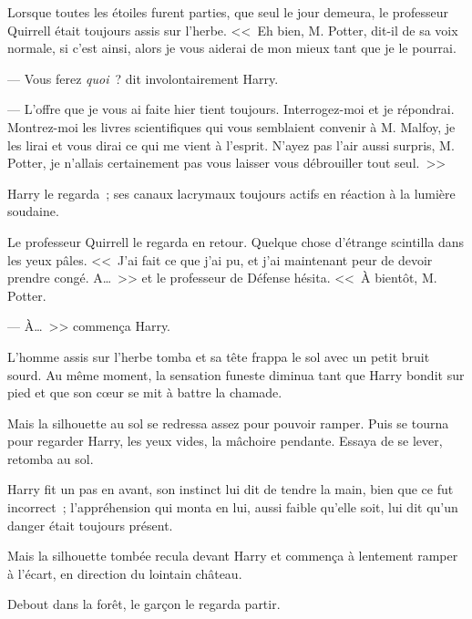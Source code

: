 Lorsque toutes les étoiles furent parties, que seul le jour demeura, le professeur Quirrell était toujours assis sur l'herbe. <<~Eh bien, M. Potter, dit-il de sa voix normale, si c'est ainsi, alors je vous aiderai de mon mieux tant que je le pourrai.

--- Vous ferez \emph{quoi}~? dit involontairement Harry.

--- L'offre que je vous ai faite hier tient toujours. Interrogez-moi et je répondrai. Montrez-moi les livres scientifiques qui vous semblaient convenir à M. Malfoy, je les lirai et vous dirai ce qui me vient à l'esprit. N'ayez pas l'air aussi surpris, M. Potter, je n'allais certainement pas vous laisser vous débrouiller tout seul.~>>

Harry le regarda~; ses canaux lacrymaux toujours actifs en réaction à la lumière soudaine.

Le professeur Quirrell le regarda en retour. Quelque chose d'étrange scintilla dans les yeux pâles. <<~J'ai fait ce que j'ai pu, et j'ai maintenant peur de devoir prendre congé. A…~>> et le professeur de Défense hésita. <<~À bientôt, M. Potter.

--- À…~>> commença Harry.

L'homme assis sur l'herbe tomba et sa tête frappa le sol avec un petit bruit sourd. Au même moment, la sensation funeste diminua tant que Harry bondit sur pied et que son cœur se mit à battre la chamade.

Mais la silhouette au sol se redressa assez pour pouvoir ramper. Puis se tourna pour regarder Harry, les yeux vides, la mâchoire pendante. Essaya de se lever, retomba au sol.

Harry fit un pas en avant, son instinct lui dit de tendre la main, bien que ce fut incorrect~; l'appréhension qui monta en lui, aussi faible qu'elle soit, lui dit qu'un danger était toujours présent.

Mais la silhouette tombée recula devant Harry et commença à lentement ramper à l'écart, en direction du lointain château.

Debout dans la forêt, le garçon le regarda partir. 

